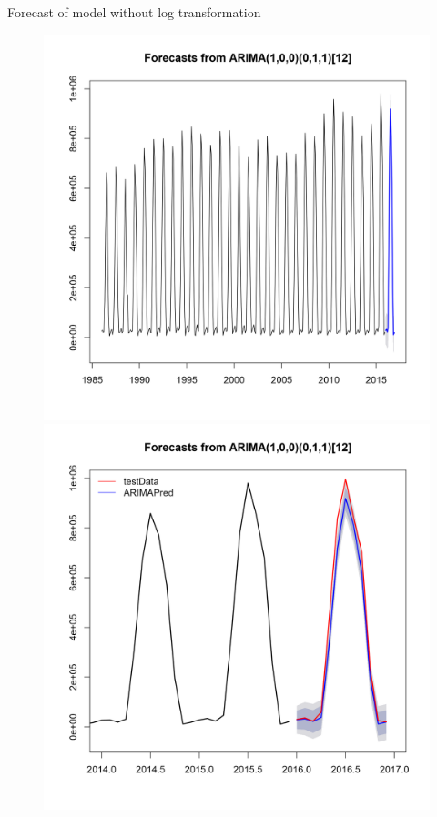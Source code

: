 \documentclass[xcolor=dvipsnames]{beamer}
\begin{document}
\begin{frame}{Forecast of model without log transformation}

\vspace{-1em}
\begin{figure}
\centering\includegraphics[width=.47\linewidth]{../normalplots/forecast95-fitV-plot.png} \hfill \centering\includegraphics[width=.47\linewidth]{../normalplots/forecastGOOD-fitV-plot.png}
\end{figure}

\vfill 
\end{frame}
\end{document}
